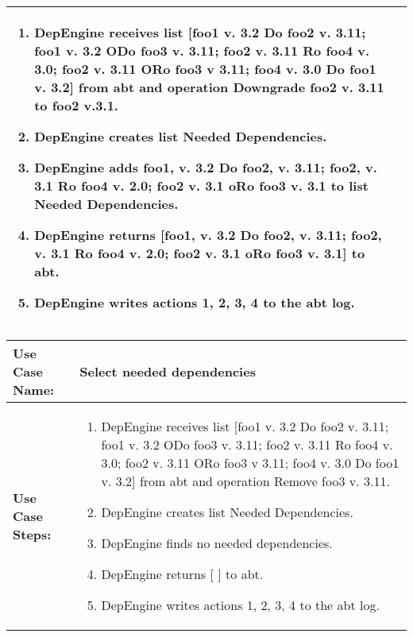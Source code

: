 \begin{tabularx}{\linewidth}{|l|X|}
\begin{minipage}{\linewidth} 
  \vspace{0.05em}
  \begin{enumerate}
  \item DepEngine receives list [foo1 v. 3.2 Do foo2 v. 3.11; foo1 v. 3.2 ODo foo3 v. 3.11; foo2 v. 3.11 Ro foo4 v. 3.0; foo2 v. 3.11 ORo foo3 v 3.11; foo4 v. 3.0 Do foo1 v. 3.2] from abt and operation Downgrade foo2 v. 3.11 to foo2 v.3.1.
  \item DepEngine creates list Needed Dependencies.
  \item DepEngine adds foo1, v. 3.2 Do foo2, v. 3.11; foo2, v. 3.1 Ro foo4 v. 2.0; foo2 v. 3.1 oRo foo3 v. 3.1 to list Needed Dependencies.
  \item DepEngine returns [foo1, v. 3.2 Do foo2, v. 3.11; foo2, v. 3.1 Ro foo4 v. 2.0; foo2 v. 3.1 oRo foo3 v. 3.1] to abt.
  \item DepEngine writes actions 1, 2, 3, 4 to the abt log.
    \end{enumerate}
  \vspace{0.05em}
\end{minipage}
\\
\hline 

\end{tabularx}
\newpage

\begin{tabularx}{\linewidth}{|l|X|}
\hline
\textbf{Use Case Name:} & \textbf{Select needed dependencies} \\
\hline
\textbf{Use Case Steps:} & 
\begin{minipage}{\linewidth} 
  \vspace{0.05em}
  \begin{enumerate}
  \item DepEngine receives list [foo1 v. 3.2 Do foo2 v. 3.11; foo1 v. 3.2 ODo foo3 v. 3.11; foo2 v. 3.11 Ro foo4 v. 3.0; foo2 v. 3.11 ORo foo3 v 3.11; foo4 v. 3.0 Do foo1 v. 3.2] from abt and operation Remove foo3 v. 3.11.
  \item DepEngine creates list Needed Dependencies.
  \item DepEngine finds no needed dependencies.
  \item DepEngine returns [ ] to abt.
  \item DepEngine writes actions 1, 2, 3, 4 to the abt log.
    \end{enumerate}
  \vspace{0.05em}
\end{minipage}
\\
\hline 
\end{tabularx}